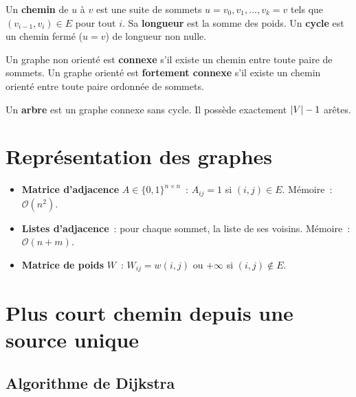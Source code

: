 \begin{definition}
Un \textbf{chemin} de $u$ \`a $v$ est une suite de sommets
$u = v_0, v_1, \ldots, v_k = v$ tels que $(v_{i-1}, v_i) \in E$ pour tout
$i$.  Sa \textbf{longueur} est la somme des poids.  Un \textbf{cycle} est
un chemin ferm\'e ($u = v$) de longueur non nulle.
\end{definition}

\begin{definition}
Un graphe non orient\'e est \textbf{connexe} s'il existe un chemin entre
toute paire de sommets.  Un graphe orient\'e est \textbf{fortement connexe}
s'il existe un chemin orient\'e entre toute paire ordonn\'ee de sommets.
\end{definition}

\begin{definition}[Arbre]
Un \textbf{arbre} est un graphe connexe sans cycle.  Il poss\`ede
exactement $\left| V \right| - 1$ ar\^etes.
\end{definition}

\section{Repr\'esentation des graphes}

\begin{formules}[title=\textbf{Structures de donn\'ees}]
\begin{itemize}
  \item \textbf{Matrice d'adjacence} $A \in \{0,1\}^{n \times n}$~:
        $A_{ij} = 1$ si $(i,j) \in E$.  M\'emoire~: $\mathcal{O}(n^2)$.
  \item \textbf{Listes d'adjacence}~: pour chaque sommet, la liste de ses
        voisins.  M\'emoire~: $\mathcal{O}(n + m)$.
  \item \textbf{Matrice de poids} $W$~: $W_{ij} = w(i,j)$ ou $+\infty$
        si $(i,j) \notin E$.
\end{itemize}
\end{formules}

\section{Plus court chemin depuis une source unique}

\subsection{Algorithme de Dijkstra}

